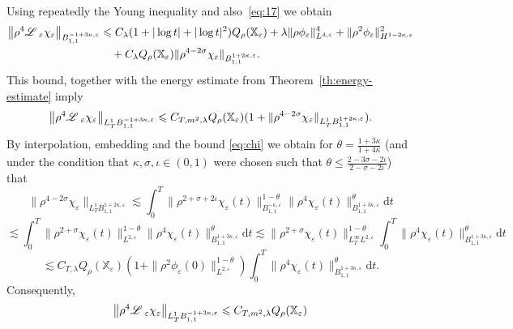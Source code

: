 \documentclass[a4paper,11pt]{article}
\newcommand{\mathd}{\mathrm{d}}
\numberwithin{equation}{section}
\newcommand{\LL}{\mathscr{L} \hspace{.2em}}
\begin{document}
Using repeatedly the Young inequality and also~\eqref{eq:17} we obtain
  \[ \begin{aligned}
     \left\| \rho^4 \LL_{\varepsilon} \chi_{\varepsilon} \right\|_{B_{1,
       1}^{- 1 + 3 \kappa, \varepsilon}} & \leqslant  C_{\lambda} (1+| \log t | +|\log t|^{2})Q_{\rho}
     (\mathbb{X}_{\varepsilon})+\lambda \| \rho \phi_{\varepsilon} \|_{L^{4, \varepsilon}}^4 +
     \| \rho^2 \phi_{\varepsilon} \|_{H^{1 - 2 \kappa, \varepsilon}}^2\\
     &  \quad + C_{\lambda }Q_{\rho} (\mathbb{X}_{\varepsilon}) \|
     \rho^{4 - 2 \sigma} \chi_{\varepsilon} \|_{B_{1, 1}^{1 + 2 \kappa,
     \varepsilon}}.
   \end{aligned} \]   
This bound, together with the energy estimate from Theorem~\ref{th:energy-estimate} imply
  \[ \left\| \rho^4 \LL_{\varepsilon} \chi_{\varepsilon} \right\|_{L_T^1 B_{1,
     1}^{- 1 + 3 \kappa, \varepsilon}} \leqslant C_{T,m^2,\lambda} Q_{\rho}
     (\mathbb{X}_{\varepsilon})  (1+ \| \rho^{4 - 2 \sigma} \chi_{\varepsilon}
     \|_{L^1_T B_{1, 1}^{1 + 2 \kappa, \varepsilon}}) . \]
  By interpolation, embedding and the bound {\eqref{eq:chi}} we obtain for
  $\theta = \frac{1 + 3 \kappa}{1 + 4 \kappa}$ (and under the condition that
  $\kappa, \sigma, \iota \in (0, 1)$ were chosen such that $\theta \leqslant
  \frac{2 - 3 \sigma - 2 \iota}{2 - \sigma - 2 \iota}$) that
  \[ \| \rho^{4 - 2 \sigma} \chi_{\varepsilon} \|_{L^1_T B_{1, 1}^{1 + 2
     \kappa, \varepsilon}} \lesssim \int_0^T \| \rho^{2 + \sigma + 2 \iota}
     \chi_{\varepsilon} (t) \|_{B^{- \kappa, \varepsilon}_{1, 1}}^{1 - \theta}
     \| \rho^4 \chi_{\varepsilon} (t) \|_{B^{1 + 3 \kappa, \varepsilon}_{1,
     1}}^{\theta} \mathd t \]
  \[ \lesssim \int_0^T \| \rho^{2 + \sigma} \chi_{\varepsilon} (t) \|_{L^{2,
     \varepsilon}}^{1 - \theta} \| \rho^4 \chi_{\varepsilon} (t) \|_{B^{1 + 3
     \kappa, \varepsilon}_{1, 1}}^{\theta} \mathd t \lesssim \| \rho^{2 +
     \sigma} \chi_{\varepsilon} (t) \|_{L^{\infty}_T L^{2, \varepsilon}}^{1 -
     \theta} \int_0^T \| \rho^4 \chi_{\varepsilon} (t) \|_{B^{1 + 3 \kappa,
     \varepsilon}_{1, 1}}^{\theta} \mathd t \]
  \[ \lesssim C_{T,\lambda} Q_{\rho} (\mathbb{X}_{\varepsilon}) (1 +\| \rho^2 \phi_{\varepsilon} (0)\|^{1 - \theta}_{L^{2, \varepsilon}}) \int_0^T \| \rho^4
     \chi_{\varepsilon} (t) \|_{B^{1 + 3 \kappa, \varepsilon}_{1, 1}}^{\theta}
     \mathd t .\]
  Consequently,
  \[ \left\| \rho^4 \LL_{\varepsilon} \chi_{\varepsilon} \right\|_{L_T^1 B_{1,
     1}^{- 1 + 3 \kappa, \varepsilon}} \leqslant C_{T,m^2,\lambda} Q_{\rho}
     (\mathbb{X}_{\varepsilon}) \]
\end{document}
